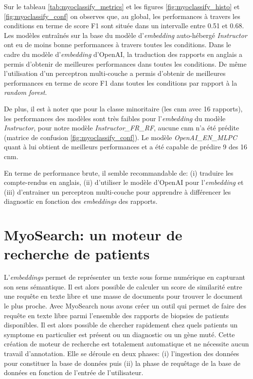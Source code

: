 Sur le tableau \ref{tab:myoclassify_metrics} et les figures \ref{fig:myoclassify_histo} et \ref{fig:myoclassify_conf} on observes que, au global, les performances à travers les conditions en terme de score F1 sont située dans un intervalle entre 0.51 et 0.68. Les modèles entraînés sur la base du modèle d'\textit{embedding} auto-hébergé \textit{Instructor} ont eu de moins bonne performances à travers toutes les conditions. Dans le cadre du modèle d'\textit{embedding} d'OpenAI, la traduction des rapports en anglais a permis d'obtenir de meilleures performances dans toutes les conditions. De même l'utilisation d'un perceptron multi-couche a permis d'obtenir de meilleures performances en terme de score F1 dans toutes les conditions par rapport à la \textit{random forest}.

De plus, il est à noter que pour la classe minoritaire (les \gls{cnm} avec 16 rapports), les performances des modèles sont très faibles pour l'\textit{embedding} du modèle \textit{Instructor}, pour notre modèle \textit{Instructor\_FR\_RF}, aucune \gls{cnm} n'a été prédite (matrice de confusion \ref{fig:myoclassify_conf}). Le modèle \textit{OpenAI\_EN\_MLPC} quant à lui obtient de meilleurs performances et a été capable de prédire 9 des 16 \gls{cnm}.  

En terme de performance brute, il semble recommandable de: (i) traduire les compte-rendus en anglais, (ii) d'utiliser le modèle d'OpenAI pour l'\textit{embedding} et (iii) d'entrainer un perceptron multi-couche pour apprendre à différencer les diagnostic en fonction des \textit{embeddings} des rapports. 

\section{MyoSearch: un moteur de recherche de patients}
L'\textit{embeddings} permet de représenter un texte sous forme numérique en capturant son sens sémantique. Il est alors possible de calculer un score de similarité entre une requête en texte libre et une masse de documents pour trouver le document le plus proche. Avec MyoSearch nous avons créer un outil qui permet de faire des requête en texte libre parmi l'ensemble des rapports de biopsies de patients disponibles. Il est alors possible de chercher rapidement chez quels patients un symptome en particulier est présent ou un diagnostic ou un gène muté. Cette création de moteur de recherche est totalement automatique et ne nécessite aucun travail d'annotation. Elle se déroule en deux phases: (i) l'ingestion des données pour constituer la base de données puis (ii) la phase de requêtage de la base de données en fonction de l'entrée de l'utilisateur.

